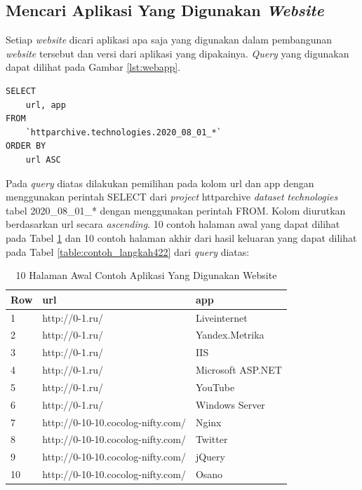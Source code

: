 \subsection{Mencari Aplikasi Yang Digunakan \textit{Website}}
Setiap \textit{website} dicari aplikasi apa saja yang digunakan dalam pembangunan \textit{website} tersebut dan versi dari aplikasi yang dipakainya. \textit{Query} yang digunakan dapat dilihat pada Gambar \ref{lst:webapp}.
\begin{lstlisting}[caption={Mencari Aplikasi yang Digunakan Website}, label={lst:webapp}]
SELECT 
	url, app
FROM 
	`httparchive.technologies.2020_08_01_*`
ORDER BY 
	url ASC
\end{lstlisting}

Pada \textit{query} diatas dilakukan pemilihan pada kolom url dan app dengan menggunakan perintah SELECT dari \textit{project} httparchive \textit{dataset} \textit{technologies} tabel 2020\_08\_01\_* dengan menggunakan perintah FROM. Kolom diurutkan berdasarkan url secara \textit{ascending}. 10 contoh halaman awal yang dapat dilihat pada Tabel \ref{table:contoh_langkah421} dan 10 contoh halaman akhir dari hasil keluaran yang dapat dilihat pada Tabel \ref{table:contoh_langkah422} dari \textit{query} diatas:

\begin{table}[H]
	\centering
	\begin{tabular}{|l|l|l|}
		\hline
		\textbf{Row} & \textbf{url} & \textbf{app}\\
		\hline
		1 & http://0-1.ru/ & Liveinternet\\
		\hline
		2 & http://0-1.ru/ & Yandex.Metrika\\
		\hline
		3 & http://0-1.ru/ & IIS\\
		\hline
		4 & http://0-1.ru/ & Microsoft ASP.NET\\
		\hline
		5 & http://0-1.ru/ & YouTube\\
		\hline
		6 & http://0-1.ru/ & Windows Server\\
		\hline
		7 & 	
		http://0-10-10.cocolog-nifty.com/  & 	
		Nginx \\
		\hline
		8 & 	
		http://0-10-10.cocolog-nifty.com/  & Twitter\\
		\hline
		9 & 	
		http://0-10-10.cocolog-nifty.com/  & jQuery\\
		\hline
		10 & 	
		http://0-10-10.cocolog-nifty.com/  & Osano\\
		\hline
	\end{tabular}
	\caption{10 Halaman Awal Contoh Aplikasi Yang Digunakan Website}
	\label{table:contoh_langkah421}
\end{table}

